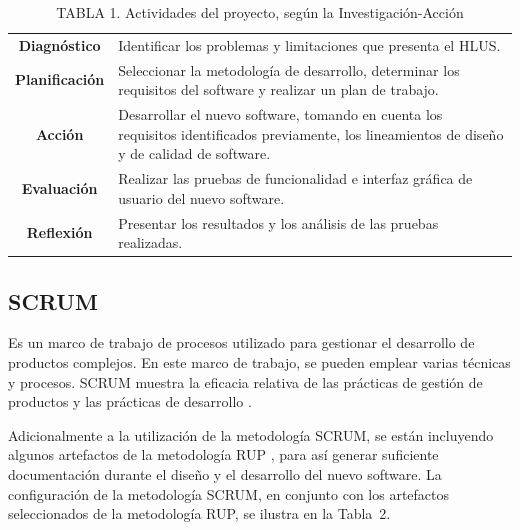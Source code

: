 \documentclass[conference]{IEEEtran}
\begin{document}
		\FloatBarrier %
		\begin{table}[htb]
			\caption{TABLA 1. Actividades del proyecto, seg\'{u}n la Investigaci\'{o}n-Acci\'{o}n}
			\label{tabla_1}
			\centering
			\setlength{\extrarowheight}{2.5pt}
			\begin{tabulary}{8.8cm}{|c|J|}
				\hline
				 & \\ \hline
				\textbf{Diagn\'{o}stico} & Identificar los problemas y limitaciones que presenta el HLUS.\\ \hline
				\textbf{Planificaci\'{o}n} & Seleccionar la metodolog\'{i}a de desarrollo, determinar los requisitos del software y realizar un plan de trabajo.
\\ \hline
				\textbf{Acci\'{o}n} & Desarrollar el nuevo software, tomando en cuenta los requisitos identificados previamente, los lineamientos de dise\~{n}o y de calidad de software.\\ \hline
				\textbf{Evaluaci\'{o}n} & Realizar las pruebas de funcionalidad e interfaz gr\'{a}fica de usuario del nuevo software.\\ \hline
				\textbf{Reflexi\'{o}n} & Presentar los resultados y los an\'{a}lisis de las pruebas realizadas.\\ \hline
			\end{tabulary}
		\end{table}
		\FloatBarrier %

	\subsection{SCRUM}
		Es un marco de trabajo de procesos utilizado para gestionar el desarrollo de productos complejos. En este marco de trabajo, se pueden emplear varias t\'{e}cnicas y procesos. SCRUM muestra la eficacia relativa de las pr\'{a}cticas de gesti\'{o}n de productos y las pr\'{a}cticas de desarrollo \cite{Schwaber&Sutherland}.

		Adicionalmente a la utilizaci\'{o}n de la metodolog\'{i}a SCRUM, se est\'{a}n incluyendo algunos artefactos de la metodolog\'{i}a RUP \cite{Kroll&Kruchten}, para as\'{i} generar suficiente documentaci\'{o}n durante el dise\~{n}o y el desarrollo del nuevo software. La configuraci\'{o}n de la metodolog\'{i}a SCRUM, en conjunto con los artefactos seleccionados de la metodolog\'{i}a RUP, se ilustra en la \mbox{Tabla 2}.
		
\end{document}
